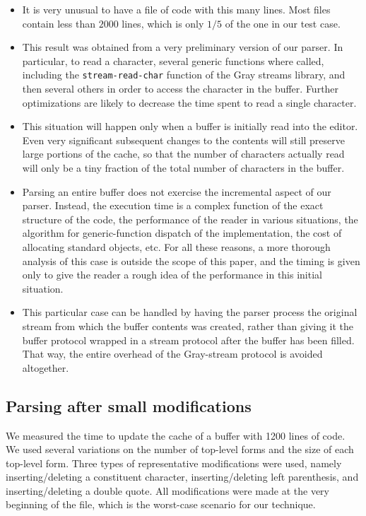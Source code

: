 \begin{itemize}
\item It is very unusual to have a file of \commonlisp{} code with
  this many lines.  Most files contain less than $2000$ lines, which
  is only $1/5$ of the one in our test case.
\item This result was obtained from a very preliminary version of our
  parser.  In particular, to read a character, several generic
  functions where called, including the \texttt{stream-read-char}
  function of the Gray streams library, and then several others in
  order to access the character in the buffer.  Further optimizations
  are likely to decrease the time spent to read a single character.
\item This situation will happen only when a buffer is initially read
  into the editor.  Even very significant subsequent changes to the
  contents will still preserve large portions of the cache, so that
  the number of characters actually read will only be a tiny fraction
  of the total number of characters in the buffer.
\item Parsing an entire buffer does not exercise the incremental
  aspect of our parser.  Instead, the execution time is a
  complex function of the exact structure of the code, the performance
  of the reader in various situations, the algorithm for
  generic-function dispatch of the implementation, the cost of
  allocating standard objects, etc.  For all these reasons, a more
  thorough analysis of this case is outside the scope of this paper,
  and the timing is given only to give the reader a rough idea of the
  performance in this initial situation.
\item This particular case can be handled by having the parser process
  the original stream from which the buffer contents was created,
  rather than giving it the buffer protocol wrapped in a stream
  protocol after the buffer has been filled.  That way, the entire
  overhead of the Gray-stream protocol is avoided altogether.
\end{itemize}

\subsection{Parsing after small modifications}

We measured the time to update the cache of a buffer with 1200 lines
of \commonlisp{} code.  We used several variations on the number of
top-level forms and the size of each top-level form.  Three types of
representative modifications were used, namely inserting/deleting a
constituent character, inserting/deleting left parenthesis, and
inserting/deleting a double quote.  All modifications were made at the
very beginning of the file, which is the worst-case scenario for our
technique.

